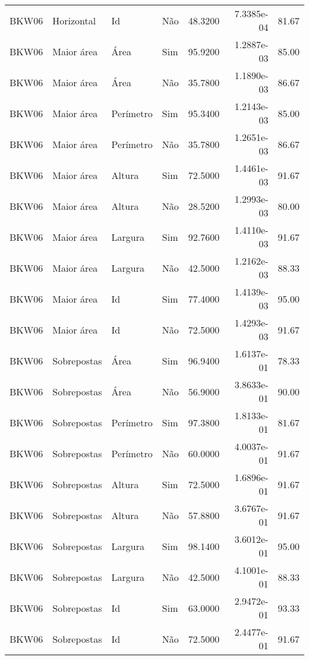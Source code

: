 \begin{tabular}{llllrrr}
BKW06     & Horizontal  & Id        & Não         & 48.3200      & 7.3385e-04 & 81.67    \\
BKW06     & Maior área  & Área      & Sim         & 95.9200      & 1.2887e-03 & 85.00    \\
BKW06     & Maior área  & Área      & Não         & 35.7800      & 1.1890e-03 & 86.67    \\
BKW06     & Maior área  & Perímetro & Sim         & 95.3400      & 1.2143e-03 & 85.00    \\
BKW06     & Maior área  & Perímetro & Não         & 35.7800      & 1.2651e-03 & 86.67    \\
BKW06     & Maior área  & Altura    & Sim         & 72.5000      & 1.4461e-03 & 91.67    \\
BKW06     & Maior área  & Altura    & Não         & 28.5200      & 1.2993e-03 & 80.00    \\
BKW06     & Maior área  & Largura   & Sim         & 92.7600      & 1.4110e-03 & 91.67    \\
BKW06     & Maior área  & Largura   & Não         & 42.5000      & 1.2162e-03 & 88.33    \\
BKW06     & Maior área  & Id        & Sim         & 77.4000      & 1.4139e-03 & 95.00    \\
BKW06     & Maior área  & Id        & Não         & 72.5000      & 1.4293e-03 & 91.67    \\
BKW06     & Sobrepostas & Área      & Sim         & 96.9400      & 1.6137e-01 & 78.33    \\
BKW06     & Sobrepostas & Área      & Não         & 56.9000      & 3.8633e-01 & 90.00    \\
BKW06     & Sobrepostas & Perímetro & Sim         & 97.3800      & 1.8133e-01 & 81.67    \\
BKW06     & Sobrepostas & Perímetro & Não         & 60.0000      & 4.0037e-01 & 91.67    \\
BKW06     & Sobrepostas & Altura    & Sim         & 72.5000      & 1.6896e-01 & 91.67    \\
BKW06     & Sobrepostas & Altura    & Não         & 57.8800      & 3.6767e-01 & 91.67    \\
BKW06     & Sobrepostas & Largura   & Sim         & 98.1400      & 3.6012e-01 & 95.00    \\
BKW06     & Sobrepostas & Largura   & Não         & 42.5000      & 4.1001e-01 & 88.33    \\
BKW06     & Sobrepostas & Id        & Sim         & 63.0000      & 2.9472e-01 & 93.33    \\
BKW06     & Sobrepostas & Id        & Não         & 72.5000      & 2.4477e-01 & 91.67    \\
\hline
\end{tabular}